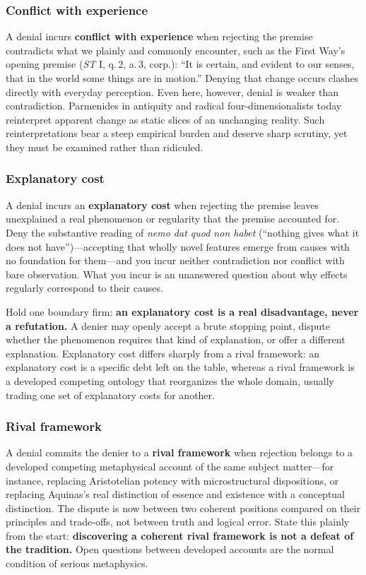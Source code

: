 \subsubsection*{Conflict with experience}

A denial incurs \textbf{conflict with experience} when rejecting the premise contradicts what we plainly and commonly encounter, such as the First Way's opening premise (\emph{ST} I, q.\,2, a.\,3, corp.): ``It is certain, and evident to our senses, that in the world some things are in motion.'' Denying that change occurs clashes directly with everyday perception. Even here, however, denial is weaker than contradiction. Parmenides in antiquity and radical four-dimensionalists today reinterpret apparent change as static slices of an unchanging reality. Such reinterpretations bear a steep empirical burden and deserve sharp scrutiny, yet they must be examined rather than ridiculed.

\subsubsection*{Explanatory cost}

A denial incurs an \textbf{explanatory cost} when rejecting the premise leaves unexplained a real phenomenon or regularity that the premise accounted for. Deny the substantive reading of \emph{nemo dat quod non habet} (``nothing gives what it does not have'')---accepting that wholly novel features emerge from causes with no foundation for them---and you incur neither contradiction nor conflict with bare observation. What you incur is an unanswered question about why effects regularly correspond to their causes.

Hold one boundary firm: \textbf{an explanatory cost is a real disadvantage, never a refutation.} A denier may openly accept a brute stopping point, dispute whether the phenomenon requires that kind of explanation, or offer a different explanation. Explanatory cost differs sharply from a rival framework: an explanatory cost is a specific debt left on the table, whereas a rival framework is a developed competing ontology that reorganizes the whole domain, usually trading one set of explanatory costs for another.

\subsubsection*{Rival framework}

A denial commits the denier to a \textbf{rival framework} when rejection belongs to a developed competing metaphysical account of the same subject matter---for instance, replacing Aristotelian potency with microstructural dispositions, or replacing Aquinas's real distinction of essence and existence with a conceptual distinction. The dispute is now between two coherent positions compared on their principles and trade-offs, not between truth and logical error. State this plainly from the start: \textbf{discovering a coherent rival framework is not a defeat of the tradition.} Open questions between developed accounts are the normal condition of serious metaphysics.

